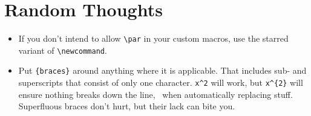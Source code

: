 \section{Random Thoughts}

\begin{itemize}
	\item If you don't intend to allow \verb|\par| in your custom macros, use the starred variant of \verb|\newcommand|.
	\item Put \verb|{braces}| around anything where it is applicable.
	That includes sub- and superscripts that consist of only one character.
	\verb|x^2| will work, but \verb|x^{2}| will ensure nothing breaks down the line, \ when automatically replacing stuff.
	Superfluous braces don't hurt, but their lack can bite you.
\end{itemize}
